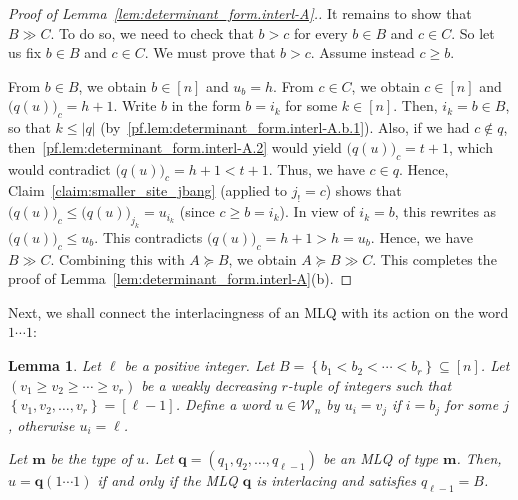 \documentclass[reqno]{amsart}
\newcommand{\0}{\phantom{c}}
\newcommand{\mm}{\mathbf{m}}
\newcommand{\qq}{\mathbf{q}}
\newcommand{\mcW}{\mathcal{W}}
\newcommand{\set}[1]{\left\{ #1 \right\}}
\newcommand{\abs}[1]{\left| #1 \right|}
\newcommand{\tup}[1]{\left( #1 \right)}
\newcommand{\ive}[1]{\left[ #1 \right]}
\theoremstyle{plain}
\newtheorem{lemma}[thm]{Lemma}
\theoremstyle{definition}
\numberwithin{equation}{section}
\newcommand{\Darij}[1]{\todo[size=\tiny,inline,color=red!30]{#1
      \\ \hfill --- Darij}}
\begin{document}
\begin{proof}[Proof of Lemma~\ref{lem:determinant_form.interl-A}.]
It remains to show that $B \gg C$.
To do so, we need to check that $b > c$ for every $b \in B$ and $c \in C$.
So let us fix $b \in B$ and $c \in C$.
We must prove that $b > c$. Assume instead $c \geq b$.

From $b\in B$, we obtain $b \in \ive{n}$ and $u_{b} = h$.
From $c\in C$, we obtain $c\in \ive{n}$ and $\bigl( q(u) \bigr)_{c} = h+1$.
Write $b$ in the form $b=i_k$ for some $k\in \ive{n}$.
Then, $i_k=b\in B$, so that $k\leq \abs{q}$ (by~\eqref{pf.lem:determinant_form.interl-A.b.1}).
Also, if we had $c\notin q$, then~\eqref{pf.lem:determinant_form.interl-A.2} would yield $\bigl( q(u) \bigr)_{c} = t+1$, which would contradict $\bigl( q(u) \bigr)_c = h + 1 < t + 1$.
Thus, we have $c\in q$.
Hence, Claim~\ref{claim:smaller_site_jbang} (applied to $j_{!} = c$) shows that $\bigl( q(u) \bigr)_c \leq \bigl( q(u) \bigr)_{j_k} = u_{i_k}$ (since $c \geq b = i_k$).
In view of $i_k = b$, this rewrites as $\bigl( q(u) \bigr)_{c} \leq u_{b}$.
This contradicts $\bigl( q(u) \bigr)_c = h + 1 > h = u_{b}$.
Hence, we have $B\gg C$.
Combining this with $A\succeq B$, we obtain $A \succeq B \gg C$.
This completes the proof of Lemma~\ref{lem:determinant_form.interl-A}(b).
\end{proof}

Next, we shall connect the interlacingness of an MLQ with its action on the word $1\dotsm 1$:

\begin{lemma}
\label{lem:determinant_form.interl-act}
Let $\ell$ be a positive integer. Let
$B = \set{ b_1 < b_2 < \cdots < b_r }  \subseteq \ive{n}$.
Let $\left( v_1 \geq v_2 \geq \dotsm \geq v_r \right)$ be a weakly decreasing $r$-tuple of integers such that $\set{ v_1, v_2, \dotsc, v_r } = \ive{\ell-1}$.
Define a word $u \in \mcW_n$ by $u_i = v_j$ if $i = b_j$ for some $j$, otherwise $u_i = \ell$.

Let $\mm$ be the type of $u$. Let $\qq = \tup{q_1, q_2, \dotsc, q_{\ell-1}}$ be an MLQ of type $\mm$.
Then, $u = \qq(1\dotsm 1)$ if and only if the MLQ $\qq$ is interlacing and satisfies $q_{\ell-1} = B$.
\end{lemma}

\Darij{TODO: Example.}
\end{document}

